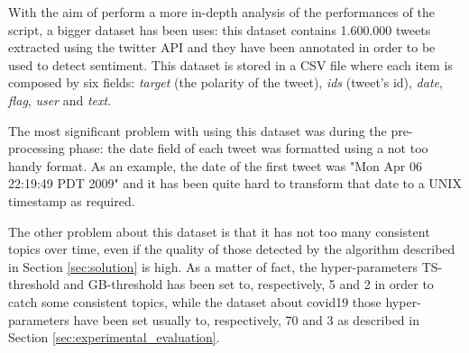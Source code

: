 With the aim of perform a more in-depth analysis of the performances of the script, a bigger dataset has been uses: this dataset \cite{sentiment-analysis-dataset} contains 1.600.000 tweets extracted using the twitter API and they have been annotated in order to be used to detect sentiment. This dataset is stored in a CSV file where each item is composed by six fields: \textit{target} (the polarity of the tweet), \textit{ids} (tweet's id), \textit{date}, \textit{flag}, \textit{user} and \textit{text}. 

The most significant problem with using this dataset was during the pre-processing phase: the date field of each tweet was formatted using a not too handy format. As an example, the date of the first tweet was "Mon Apr 06 22:19:49 PDT 2009" and it has been quite hard to transform that date to a UNIX timestamp as required.

The other problem about this dataset is that it has not too many consistent topics over time, even if the quality of those detected by the algorithm described in Section \ref{sec:solution} is high. As a matter of fact, the hyper-parameters TS-threshold and GB-threshold has been set to, respectively, 5 and 2 in order to catch some consistent topics, while the dataset about covid19 \cite{covid19-tweets-dataset} those hyper-parameters have been set usually to, respectively, 70 and 3 as described in Section \ref{sec:experimental_evaluation}. 
